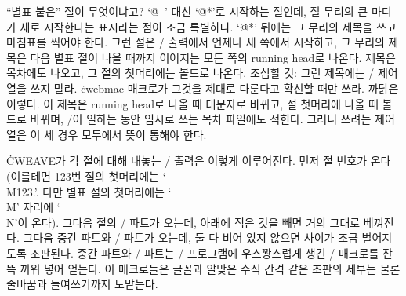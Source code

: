 ``별표 붙은'' 절이 무엇이냐고? `\.{@\ }' 대신 `\.{@*}'로 시작하는 절인데, 절
무리의 큰 마디가 새로 시작한다는 표시라는 점이 조금 특별하다. `\.{@*}' 뒤에는
그 무리의 제목을 쓰고 마침표를 찍어야 한다. 그런 절은 \TEX/ 출력에서 언제나
새 쪽에서 시작하고, 그 무리의 제목은 다음 별표 절이 나올 때까지 이어지는 모든
쪽의 running head로 나온다. 제목은 목차에도 나오고, 그 절의 첫머리에는 볼드로
나온다. 조심할 것: 그런 제목에는 \TEX/ 제어열을 쓰지 말라. \.{cwebmac} 매크로가
그것을 제대로 다룬다고 확신할 때만 쓰라. 까닭은 이렇다. 이 제목은 running
head로 나올 때 대문자로 바뀌고, 절 첫머리에 나올 때 볼드로 바뀌며, \TEX/이
일하는 동안 임시로 쓰는 목차 파일에도 적힌다. 그러니 쓰려는 제어열은 이 세
경우 모두에서 뜻이 통해야 한다.

\.{CWEAVE}가 각 절에 대해 내놓는 \TEX/ 출력은 이렇게 이루어진다. 먼저 절
번호가 온다 (이를테면 123번 절의 첫머리에는 `\.{\\M123.}'. 다만 별표 절의
첫머리에는 `\.{\\M}' 자리에 `\.{\\N}'이 온다). 그다음 절의 \TEX/ 파트가 오는데,
아래에 적은 것을 빼면 거의 그대로 베껴진다. 그다음 중간 파트와 \CEE/ 파트가
오는데, 둘 다 비어 있지 않으면 사이가 조금 벌어지도록 조판된다. 중간 파트와
\CEE/ 파트는 \CEE/ 프로그램에 우스꽝스럽게 생긴 \TEX/ 매크로를 잔뜩 끼워 넣어
얻는다. 이 매크로들은 글꼴과 알맞은 수식 간격 같은 조판의 세부는 물론 줄바꿈과
들여쓰기까지 도맡는다.

